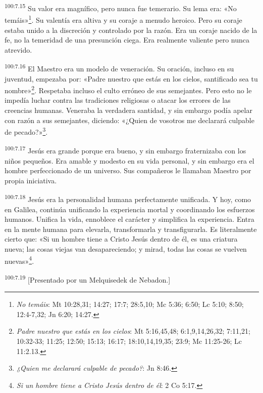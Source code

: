 \par
\textsuperscript{100:7.15} Su valor era magnífico, pero nunca fue temerario. Su lema era: «No temáis»\footnote{\textit{No temáis}: Mt 10:28,31; 14:27; 17:7; 28:5,10; Mc 5:36; 6:50; Lc 5:10; 8:50; 12:4-7,32; Jn 6:20; 14:27.}. Su valentía era altiva y su coraje a menudo heroico. Pero su coraje estaba unido a la discreción y controlado por la razón. Era un coraje nacido de la fe, no la temeridad de una presunción ciega. Era realmente valiente pero nunca atrevido.

\par
\textsuperscript{100:7.16} El Maestro era un modelo de veneración. Su oración, incluso en su juventud, empezaba por: «Padre nuestro que estás en los cielos, santificado sea tu nombre»\footnote{\textit{Padre nuestro que estás en los cielos}: Mt 5:16,45,48; 6:1,9,14,26,32; 7:11,21; 10:32-33; 11:25; 12:50; 15:13; 16:17; 18:10,14,19,35; 23:9; Mc 11:25-26; Lc 11:2.13.}. Respetaba incluso el culto erróneo de sus semejantes. Pero esto no le impedía luchar contra las tradiciones religiosas o atacar los errores de las creencias humanas. Veneraba la verdadera santidad, y sin embargo podía apelar con razón a sus semejantes, diciendo: «¿Quien de vosotros me declarará culpable de pecado?»\footnote{\textit{¿Quien me declarará culpable de pecado?}: Jn 8:46.}.

\par
\textsuperscript{100:7.17} Jesús era grande porque era bueno, y sin embargo fraternizaba con los niños pequeños. Era amable y modesto en su vida personal, y sin embargo era el hombre perfeccionado de un universo. Sus compañeros le llamaban Maestro por propia iniciativa.

\par
\textsuperscript{100:7.18} Jesús era la personalidad humana perfectamente unificada. Y hoy, como en Galilea, continúa unificando la experiencia mortal y coordinando los esfuerzos humanos. Unifica la vida, ennoblece el carácter y simplifica la experiencia. Entra en la mente humana para elevarla, transformarla y transfigurarla. Es literalmente cierto que: «Si un hombre tiene a Cristo Jesús dentro de él, es una criatura nueva; las cosas viejas van desapareciendo; y mirad, todas las cosas se vuelven nuevas»\footnote{\textit{Si un hombre tiene a Cristo Jesús dentro de él}: 2 Co 5:17.}.

\par
\textsuperscript{100:7.19} [Presentado por un Melquisedek de Nebadon.]